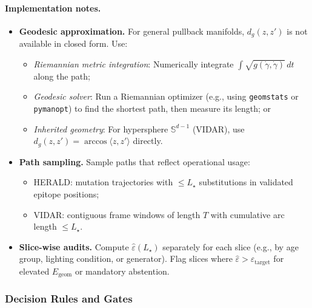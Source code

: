 \documentclass[11pt]{article}
\theoremstyle{remark}
\theoremstyle{plain}
\begin{document}
\paragraph{Implementation notes.}
\begin{itemize}[leftmargin=*]
  \item \textbf{Geodesic approximation.} For general pullback manifolds, $d_g(z,z')$ is not available in closed form. Use:
  \begin{itemize}
    \item \emph{Riemannian metric integration}: Numerically integrate $\int \sqrt{g(\dot\gamma,\dot\gamma)}\,dt$ along the path;
    \item \emph{Geodesic solver}: Run a Riemannian optimizer (e.g., using \texttt{geomstats} or \texttt{pymanopt}) to find the shortest path, then measure its length; or
    \item \emph{Inherited geometry}: For hypersphere $\mathbb{S}^{d-1}$ (VIDAR), use $d_g(z,z') = \arccos\langle z,z'\rangle$ directly.
  \end{itemize}
  
  \item \textbf{Path sampling.} Sample paths that reflect operational usage:
  \begin{itemize}
    \item HERALD: mutation trajectories with $\le L_\star$ substitutions in validated epitope positions;
    \item VIDAR: contiguous frame windows of length $T$ with cumulative arc length $\le L_\star$.
  \end{itemize}
  
  \item \textbf{Slice-wise audits.} Compute $\hat\varepsilon(L_\star)$ separately for each slice (e.g., by age group, lighting condition, or generator). Flag slices where $\hat\varepsilon > \varepsilon_{\text{target}}$ for elevated $E_{\mathrm{geom}}$ or mandatory abstention.
\end{itemize}

\subsubsection{Decision Rules and Gates}
\end{document}

